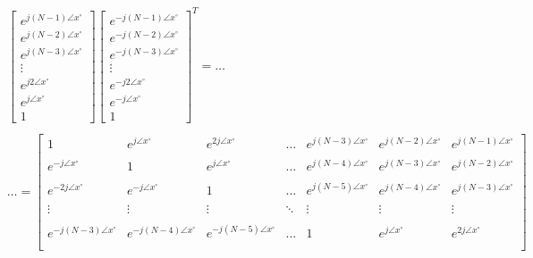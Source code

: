 \documentclass{article}
\begin{document}
\begin{align*}
    &\begin{bmatrix}
         e^{j(N - 1)\angle{x}^{\circ}} \\
         e^{j(N - 2)\angle{x}^{\circ}} \\
         e^{j(N - 3)\angle{x}^{\circ}} \\
         \vdots \\
         e^{j2\angle{x}^{\circ}} \\
         e^{j\angle{x}^{\circ}} \\
         1
       \end{bmatrix}
     \begin{bmatrix}
         e^{-j(N - 1)\angle{x}^{\circ}} \\
         e^{-j(N - 2)\angle{x}^{\circ}} \\
         e^{-j(N - 3)\angle{x}^{\circ}} \\
         \vdots \\
         e^{-j2\angle{x}^{\circ}} \\
         e^{-j\angle{x}^{\circ}} \\
         1
       \end{bmatrix}^{T} = \hdots \\ \\
    & \ldots = \begin{bmatrix}
                    1 & e^{j\angle{x}^{\circ}} & e^{2j\angle{x}^{\circ}} & \ldots & e^{j(N - 3)\angle{x}^{\circ}} & e^{j(N - 2)\angle{x}^{\circ}} & e^{j(N - 1)\angle{x}^{\circ}} \\ \\
                    e^{-j\angle{x}^{\circ}} & 1 & e^{j\angle{x}^{\circ}} & \ldots & e^{j(N - 4)\angle{x}^{\circ}} & e^{j(N - 3)\angle{x}^{\circ}} & e^{j(N - 2)\angle{x}^{\circ}} \\ \\
                    e^{-2j\angle{x}^{\circ}} & e^{-j\angle{x}^{\circ}} & 1 & \ldots & e^{j(N - 5)\angle{x}^{\circ}} & e^{j(N - 4)\angle{x}^{\circ}} & e^{j(N - 3)\angle{x}^{\circ}} \\ \\
                    \vdots & \vdots & \vdots & \ddots & \vdots & \vdots & \vdots \\ \\
                    e^{-j(N - 3)\angle{x}^{\circ}} & e^{-j(N - 4)\angle{x}^{\circ}} & e^{-j(N - 5)\angle{x}^{\circ}} & \ldots & 1 & e^{j\angle{x}^{\circ}} & e^{2j\angle{x}^{\circ}} \\ \\

\end{bmatrix}
\end{align*}
\end{document}
